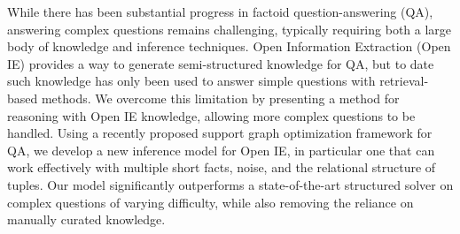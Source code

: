 While there has been substantial progress in factoid question-answering (QA), answering complex questions remains challenging, typically requiring both a large body of knowledge and inference techniques. Open Information Extraction (Open IE) provides a way to generate semi-structured knowledge for QA, but to date such knowledge has only been used to answer simple questions with retrieval-based methods. We overcome this limitation by presenting a method for reasoning with Open IE knowledge, allowing more complex questions to be handled. Using a recently proposed support graph optimization framework for QA, we develop a new inference model for Open IE, in particular one that can work effectively with multiple short facts, noise, and the relational structure of tuples. Our model significantly outperforms a state-of-the-art structured solver on complex questions of varying difficulty, while also removing the reliance on manually curated knowledge.
